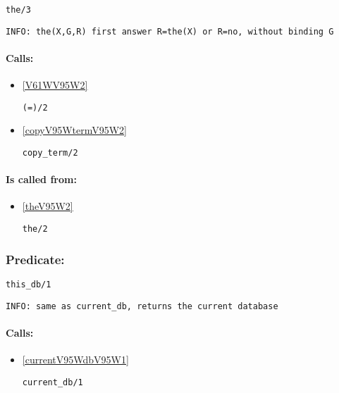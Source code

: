 \begin{verbatim}
the/3
\end{verbatim}

{\small \begin{verbatim}
INFO: the(X,G,R) first answer R=the(X) or R=no, without binding G

\end{verbatim}}
\paragraph{Calls:} 
\begin{itemize}
\item \ref{V61WV95W2} 
\begin{verbatim}
(=)/2
\end{verbatim}

\item \ref{copyV95WtermV95W2} 
\begin{verbatim}
copy_term/2
\end{verbatim}

\end{itemize}
\paragraph{Is called from:} 
\begin{itemize}
\item \ref{theV95W2} 
\begin{verbatim}
the/2
\end{verbatim}

\end{itemize}

\subsubsection{Predicate:} \label{thisV95WdbV95W1}

\begin{verbatim}
this_db/1
\end{verbatim}

{\small \begin{verbatim}
INFO: same as current_db, returns the current database

\end{verbatim}}
\paragraph{Calls:} 
\begin{itemize}
\item \ref{currentV95WdbV95W1} 
\begin{verbatim}
current_db/1
\end{verbatim}

\end{itemize}

